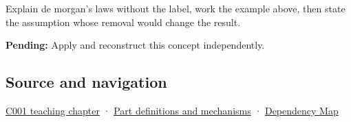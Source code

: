 Explain de morgan's laws without the label, work the example above, then state the assumption whose removal would change the result.

\textbf{Pending:} Apply and reconstruct this concept independently.

\subsection{Source and navigation}\label{appendix-9079d3659da4-source-and-navigation}

\hyperref[01-foundations-i-ch001-from-a-signal-to-an-interpretation]{C001 teaching chapter} · \hyperref[appendix-fd090d982a15]{Part definitions and mechanisms} · \hyperref[appendix-4ad47bdd269a]{Dependency Map}
